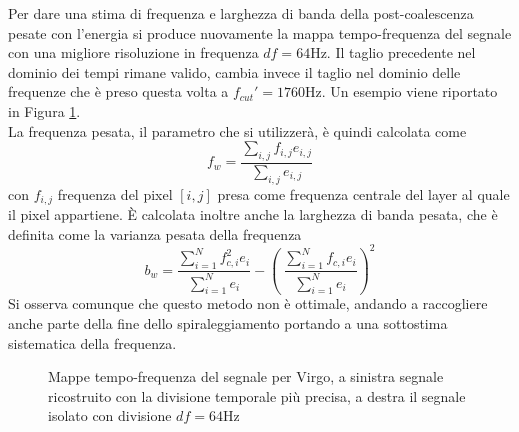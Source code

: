 Per dare una stima di frequenza e larghezza di banda della post-coalescenza pesate con l'energia si produce nuovamente la mappa tempo-frequenza del segnale con una migliore risoluzione in frequenza $df=64$Hz. Il taglio precedente nel dominio dei tempi rimane valido, cambia invece il taglio nel dominio delle frequenze che è preso questa volta a $f_{cut}' = 1760$Hz. Un esempio viene riportato in Figura \ref{fig:time_freq_pm}.\\
La frequenza pesata, il parametro che si utilizzerà, è quindi calcolata come 
\begin{equation}
f_w=\frac{\sum_{i,j}f_{i,j}e_{i,j}}{\sum_{i,j}e_{i,j}}
\end{equation}
con $f_{i,j}$ frequenza del pixel $[i,j]$ presa come frequenza centrale del layer al quale il pixel appartiene. È calcolata inoltre anche la larghezza di banda pesata, che è definita come la varianza pesata  della frequenza
\begin{equation}
b_w =\frac{\sum_{i=1}^Nf_{c,i}^2e_i}{\sum_{i=1}^Ne_i} - \left(\ \frac{\sum_{i=1}^Nf_{c,i}e_i}{\sum_{i=1}^Ne_i}\right)^2
\end{equation}
Si osserva comunque che questo metodo non è ottimale, andando a raccogliere anche parte della fine dello spiraleggiamento portando a una sottostima sistematica della frequenza.
\begin{figure}[hbt!]
	\vspace{-20pt}
	\centering
	\quad\quad
	\vspace{-8pt}
	\caption{Mappe tempo-frequenza del segnale per Virgo, a sinistra segnale ricostruito con la divisione temporale più precisa, a destra il segnale isolato con divisione $df = 64$Hz}
	\label{fig:time_freq_pm}
	\vspace{-8pt}
\end{figure}

